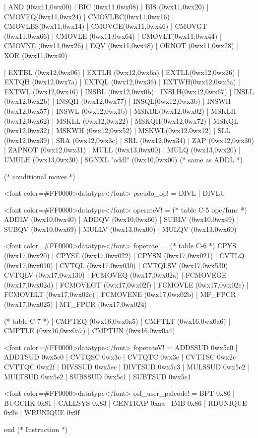 \begin{SML}
     | AND   (0wx11,0wx00) | BIC    (0wx11,0wx08) | BIS    (0wx11,0wx20)
     | CMOVEQ(0wx11,0wx24) | CMOVLBC(0wx11,0wx16) | CMOVLBS(0wx11,0wx14)
     | CMOVGE(0wx11,0wx46) | CMOVGT (0wx11,0wx66) | CMOVLE (0wx11,0wx64)
     | CMOVLT(0wx11,0wx44) | CMOVNE (0wx11,0wx26) | EQV (0wx11,0wx48)
     | ORNOT (0wx11,0wx28) | XOR    (0wx11,0wx40)

     | EXTBL (0wx12,0wx06) | EXTLH  (0wx12,0wx6a) | EXTLL(0wx12,0wx26)
     | EXTQH (0wx12,0wx7a) | EXTQL  (0wx12,0wx36) | EXTWH(0wx12,0wx5a)
     | EXTWL (0wx12,0wx16) | INSBL  (0wx12,0wx0b) | INSLH(0wx12,0wx67)
     | INSLL (0wx12,0wx2b) | INSQH  (0wx12,0wx77) | INSQL(0wx12,0wx3b)
     | INSWH (0wx12,0wx57) | INSWL  (0wx12,0wx1b) | MSKBL(0wx12,0wx02)
     | MSKLH (0wx12,0wx62) | MSKLL  (0wx12,0wx22) | MSKQH(0wx12,0wx72)
     | MSKQL (0wx12,0wx32) | MSKWH  (0wx12,0wx52) | MSKWL(0wx12,0wx12)
     | SLL   (0wx12,0wx39) | SRA    (0wx12,0wx3c) | SRL  (0wx12,0wx34)
     | ZAP   (0wx12,0wx30) | ZAPNOT (0wx12,0wx31)
     | MULL  (0wx13,0wx00)                        | MULQ (0wx13,0wx20)
                           | UMULH  (0wx13,0wx30) 
     | SGNXL "addl" (0wx10,0wx00) (* same as ADDL *)

   (* conditional moves *) 
 
   <font color=#FF0000>datatype</font> pseudo_op! = DIVL | DIVLU
 
   <font color=#FF0000>datatype</font> operateV! = (* table C-5 opc/func *)
        ADDLV (0wx10,0wx40) | ADDQV (0wx10,0wx60)
      | SUBLV (0wx10,0wx49) | SUBQV (0wx10,0wx69) 
      | MULLV (0wx13,0wx00) | MULQV (0wx13,0wx60)
 
   <font color=#FF0000>datatype</font> foperate! =   (* table C-6 *)
      CPYS    (0wx17,0wx20)  | CPYSE (0wx17,0wx022)    | CPYSN   (0wx17,0wx021)
    | CVTLQ   (0wx17,0wx010) | CVTQL (0wx17,0wx030)    | CVTQLSV (0wx17,0wx530)
    | CVTQLV  (0wx17,0wx130)
    | FCMOVEQ (0wx17,0wx02a) | FCMOVEGE (0wx17,0wx02d) | FCMOVEGT (0wx17,0wx02f)
    | FCMOVLE (0wx17,0wx02e) | FCMOVELT (0wx17,0wx02c) | FCMOVENE (0wx17,0wx02b)
    | MF_FPCR (0wx17,0wx025) | MT_FPCR  (0wx17,0wx024)

                         (* table C-7 *)
    | CMPTEQ  (0wx16,0wx0a5) | CMPTLT (0wx16,0wx0a6)   | CMPTLE  (0wx16,0wx0a7)
    | CMPTUN  (0wx16,0wx0a4)

   <font color=#FF0000>datatype</font> foperateV! = 
          ADDSSUD  0wx5c0
        | ADDTSUD  0wx5e0
        | CVTQSC   0wx3c
        | CVTQTC   0wx3e
        | CVTTSC   0wx2c
        | CVTTQC   0wx2f
        | DIVSSUD  0wx5ec
        | DIVTSUD  0wx5c3
        | MULSSUD  0wx5c2
        | MULTSUD  0wx5e2
        | SUBSSUD  0wx5c1
        | SUBTSUD  0wx5e1
 
   <font color=#FF0000>datatype</font> osf_user_palcode! = 
      BPT 0x80 | BUGCHK 0x81 | CALLSYS 0x83 
    | GENTRAP 0xaa | IMB 0x86 | RDUNIQUE 0x9e | WRUNIQUE 0x9f

   end (* Instruction *)
\end{SML}

